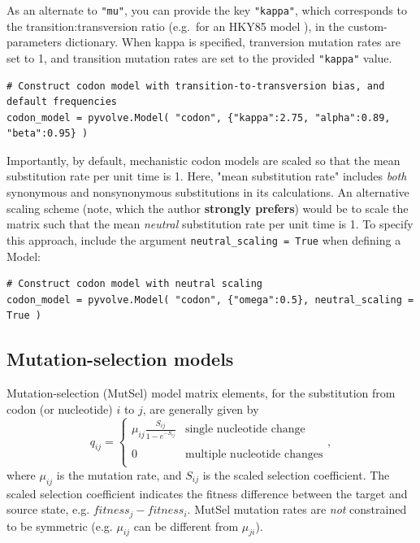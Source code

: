 \documentclass{article}
\newcommand{\code}[1]{\texttt{\small{#1}}}
\begin{document}
As an alternate to \code{"mu"}, you can provide the key \code{"kappa"}, which corresponds to the transition:transversion ratio (e.g.\ for an HKY85  model \citep{HKY85}), in the custom-parameters dictionary. When kappa is specified, tranversion mutation rates are set to 1, and transition mutation rates are set to the provided \code{"kappa"} value.

\begin{lstlisting}
# Construct codon model with transition-to-transversion bias, and default frequencies
codon_model = pyvolve.Model( "codon", {"kappa":2.75, "alpha":0.89, "beta":0.95} )
\end{lstlisting}

Importantly, by default, mechanistic codon models are scaled so that the mean substitution rate per unit time is 1. Here, "mean substitution rate" includes \emph{both} synonymous and nonsynonymous substitutions in its calculations. An alternative scaling scheme (note, which the author \textbf{strongly prefers}) would be to scale the matrix such that the mean \emph{neutral} substitution rate per unit time is 1. To specify this approach, include the argument \code{neutral\_scaling = True} when defining a Model:
\begin{lstlisting}
# Construct codon model with neutral scaling
codon_model = pyvolve.Model( "codon", {"omega":0.5}, neutral_scaling = True )
\end{lstlisting}



\subsection{Mutation-selection models}\label{sec:mutsel_basic}
Mutation-selection (MutSel) model \citep{HB98} matrix elements, for the substitution from codon (or nucleotide) $i$ to $j$, are generally given by
\begin{equation}
q_{ij} = \left\{
\begin{array}{rl}
	\mu_{ij} \frac{S_{ij}}{1-e^{-S_{ij}}} &\text{single nucleotide change} \\\\
	0                                  &\text{multiple nucleotide changes} \\
\end{array} \right.,
\end{equation} where $\mu_{ij}$ is the mutation rate, and $S_{ij}$ is the scaled selection coefficient. The scaled selection coefficient indicates the fitness difference between the target and source state, e.g. $fitness_j - fitness_i$. MutSel mutation rates are \emph{not} constrained to be symmetric (e.g. $\mu_{ij}$ can be different from $\mu_{ji}$).
\end{document}
